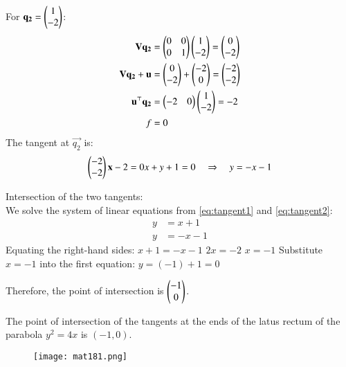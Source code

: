 \documentclass[journal]{IEEEtran}
\begin{document}
    For $\mathbf{q_2} = \begin{pmatrix}1 \\ -2\end{pmatrix}$:
    \begin{align}
    \mathbf{V}\mathbf{q_2} &= \begin{pmatrix}0 & 0 \\ 0 & 1\end{pmatrix}\begin{pmatrix}1 \\ -2\end{pmatrix} = \begin{pmatrix}0 \\ -2\end{pmatrix} \\
    \mathbf{V}\mathbf{q_2} + \mathbf{u} &= \begin{pmatrix}0 \\ -2\end{pmatrix} + \begin{pmatrix}-2 \\ 0\end{pmatrix} = \begin{pmatrix}-2 \\ -2\end{pmatrix} \\
    \mathbf{u}^{\top}\mathbf{q_2} &= \begin{pmatrix}-2 & 0\end{pmatrix}\begin{pmatrix}1 \\ -2\end{pmatrix} = -2 \\
    f &= 0
    \end{align}
    The tangent at $\vec{q_2}$ is:
    \begin{align}
    \begin{pmatrix}-2 \\ -2\end{pmatrix}\mathbf{x} - 2 = 0
     x + y + 1 = 0 \quad \Rightarrow \quad y = -x-1\label{eq:tangent2}
    \end{align}
      
      
    Intersection of the two tangents:\\
    We solve the system of linear equations from \ref{eq:tangent1} and \ref{eq:tangent2}:
    \begin{align}
    y &= x+1 \\
    y &= -x-1
    \end{align}
    Equating the right-hand sides:
    $x+1 = -x-1$
    $2x = -2$
    $x = -1$
    Substitute $x=-1$ into the first equation:
    $y = (-1) + 1 = 0$

    Therefore, the point of intersection is $\begin{pmatrix}-1 \\ 0\end{pmatrix}$.

The point of intersection of the tangents at the ends of the latus rectum of the parabola $y^2 = 4x$ is $\boxed{(-1, 0)}$.

\begin{figure}[H]
\centering
\texttt{[image: mat181.png]}
\caption{}
\label{fig:1}
\end{figure}
\end{document}
